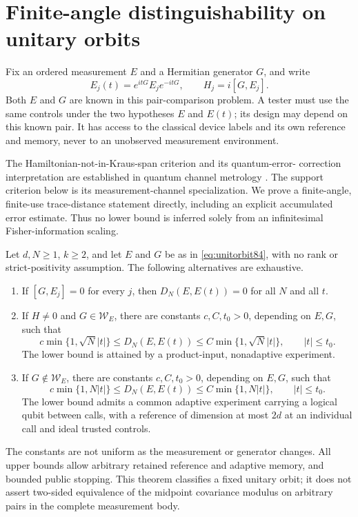\section{Finite-angle distinguishability on unitary orbits}\label{sec:orbit84}
Fix an ordered measurement $E$ and a Hermitian generator $G$, and write
\begin{equation}\label{eq:unitorbit84}
 E_j(t)=e^{itG}E_je^{-itG},\qquad H_j=i[G,E_j].
\end{equation}
Both $E$ and $G$ are known in this pair-comparison problem.  A tester
must use the same controls under the two hypotheses $E$ and $E(t)$;
its design may depend on this known pair.  It has access to the
classical device labels and its own reference and memory, never to
an unobserved measurement environment.

The Hamiltonian-not-in-Kraus-span criterion and its quantum-error-
correction interpretation are established in quantum channel metrology
\cite[Theorems~1--3]{ZJ84}.  The support criterion below is its
measurement-channel specialization.  We prove a finite-angle,
finite-use trace-distance statement directly, including an explicit
accumulated error estimate.  Thus no lower bound is inferred solely
from an infinitesimal Fisher-information scaling.

\begin{theorem}\label{thm:orbittrichotomy84}
Let $d,N\ge1$, $k\ge2$, and let $E$ and $G$ be as in
\eqref{eq:unitorbit84}, with no rank or strict-positivity assumption.
The following alternatives are exhaustive.
\begin{enumerate}
\item If $[G,E_j]=0$ for every $j$, then $D_N(E,E(t))=0$ for all
$N$ and all $t$.
\item If $H\ne0$ and $G\in\mathcal W_E$, there are constants
$c,C,t_0>0$, depending on $E,G$, such that
\begin{equation}\label{eq:orbitsql84}
 c\min\{1,\sqrt N|t|\}\le D_N(E,E(t))
 \le C\min\{1,\sqrt N|t|\},\qquad |t|\le t_0.
\end{equation}
The lower bound is attained by a product-input, nonadaptive experiment.
\item If $G\notin\mathcal W_E$, there are constants
$c,C,t_0>0$, depending on $E,G$, such that
\begin{equation}\label{eq:orbithl84}
 c\min\{1,N|t|\}\le D_N(E,E(t))
 \le C\min\{1,N|t|\},\qquad |t|\le t_0.
\end{equation}
The lower bound admits a common adaptive experiment carrying a logical
qubit between calls, with a reference of dimension at most $2d$ at
an individual call and ideal trusted controls.
\end{enumerate}
The constants are not uniform as the measurement or generator changes.
All upper bounds allow arbitrary retained reference and adaptive memory,
and bounded public stopping.  This theorem classifies a fixed unitary
orbit; it does not assert two-sided equivalence of the midpoint
covariance modulus on arbitrary pairs in the complete measurement body.
\end{theorem}

